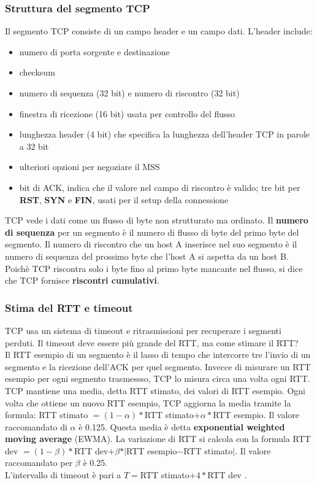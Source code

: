 \documentclass[11pt]{article}
\begin{document}
\subsubsection{Struttura del segmento TCP}
Il segmento TCP consiste di un campo header e un campo dati. L'header include:
\begin{itemize}
    \item numero di porta sorgente e destinazione
    \item checksum
    \item numero di sequenza (32 bit) e numero di riscontro (32 bit)
    \item finestra di ricezione (16 bit) usata per controllo del flusso
    \item lunghezza header (4 bit) che specifica la lunghezza dell'header TCP in parole a 32 bit
    \item ulteriori opzioni per negoziare il MSS 
    \item bit di ACK, indica che il valore nel campo di riscontro è valido; tre bit per \textbf{RST}, \textbf{SYN} e 
    \textbf{FIN}, usati per il setup della connessione
\end{itemize}
TCP vede i dati come un flusso di byte non strutturato ma ordinato. Il \textbf{numero di sequenza} per un segmento è il 
numero di flusso di byte del primo byte del segmento.
Il numero di riscontro che un host A inserisce nel suo segmento è il numero di sequenza del prossimo byte che l'host 
A si aspetta da un host B. Poichè TCP riscontra solo i byte fino al primo byte mancante nel flusso, si dice che TCP 
fornisce \textbf{riscontri cumulativi}.
\subsubsection{Stima del RTT e timeout}
TCP usa un sistema di timeout e ritrasmissioni per recuperare i segmenti perduti. Il timeout deve essere più grande del 
RTT, ma come stimare il RTT?\\
Il RTT esempio di un segmento è il lasso di tempo che intercorre tre l'invio di un segmento e la ricezione dell'ACK per 
quel segmento. Invecce di misurare un RTT esempio per ogni segmento trasmessso, TCP lo misura circa una volta ogni RTT. 
TCP mantiene una media, detta RTT stimato, dei valori di RTT esempio. Ogni volta che ottiene un nuovo RTT esempio, TCP 
aggiorna la media tramite la formula: RTT stimato $=(1-\alpha)*$RTT stimato$+\alpha*$RTT esempio. Il valore raccomandato 
di $\alpha$ è 0.125. Questa media è detta \textbf{exponential weighted moving average} (EWMA).
La variazione di RTT si calcola con la formula RTT dev $=(1-\beta)*$RTT dev$+ \beta * \vert$RTT esempio$-$RTT stimato$\vert$.
Il valore raccomandato per $\beta$ è 0.25.\\
L'intervallo di timeout è pari a $T = $RTT stimato$+4*$RTT dev .
\end{document}
